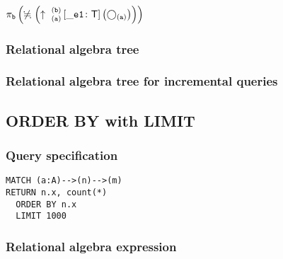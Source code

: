 $\projection{\var{b}} \left(\alldifferent{} \left(\expandout{a}{b}{}{\_e1}{T} \left(\getvertices{a}{}\right)\right)\right)$

\subsubsection*{Relational algebra tree}


\subsubsection*{Relational algebra tree for incremental queries}


\subsection{ORDER BY with LIMIT}

\subsubsection*{Query specification}

\begin{lstlisting}
MATCH (a:A)-->(n)-->(m)
RETURN n.x, count(*)
  ORDER BY n.x
  LIMIT 1000
\end{lstlisting}

\subsubsection*{Relational algebra expression}


